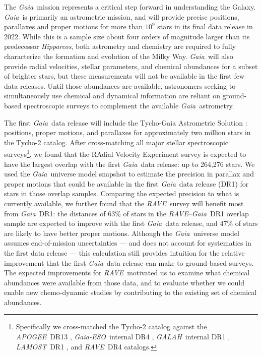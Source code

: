 \documentclass[preprint]{aastex61}
\newcommand{\acronym}[1]{{\small{#1}}}
\newcommand{\project}[1]{\textsl{#1}}
\newcommand{\gaia}{\project{Gaia}}
\newcommand{\rave}{\project{\acronym{RAVE}}}
\newcommand{\galah}{\project{\acronym{GALAH}}}
\newcommand{\ges}{\project{Gaia-ESO}}
\newcommand{\apogee}{\project{\acronym{APOGEE}}}
\newcommand{\lamost}{\project{\acronym{LAMOST}}}
\newcommand{\hipparcos}{\project{Hipparcos}}
\newcommand{\tgas}{\project{\acronym{TGAS}}}
\begin{document}
The \gaia\ mission represents a critical step forward in understanding the Galaxy.
\gaia\ is primarily an astrometric mission, and will provide precise positions,
parallaxes and proper motions for more than $10^9$ stars in its final data
release in 2022.  While this is a sample size about four orders of magnitude 
larger than its predecessor \hipparcos, both astrometry and chemistry are 
required to fully characterize the formation and evolution of the Milky Way. 
\gaia\ will also provide radial velocities, stellar parameters, and chemical 
abundances for a subset of brighter stars, but these measurements will not be 
available in the first few data releases. Until those abundances are available,
astronomers seeking to simultaneously use chemical and dynamical information are
reliant on ground-based spectroscopic surveys to complement the available 
\gaia\ astrometry.


The first \gaia\ data release will include the Tycho-Gaia Astrometric Solution
\citep[hereafter \tgas;][]{Michalik_2015a,Michalik_2015b}: positions, proper 
motions, and parallaxes for approximately two million stars in the Tycho-2 
\citep{Hog_2000} catalog.  After cross-matching all major stellar spectroscopic 
surveys\footnote{Specifically we cross-matched the Tycho-2 catalog against the 
\apogee\ DR13 \citep{Zasowski_2013}, \ges\ internal DR4 
\citep{Gilmore_2012,Randich_2013}, \galah\ internal DR1 \citep{DeSilva_2015}, 
\lamost\ DR1 \citep{Cui_2012}, and \rave\ DR4 \citep{Kordopatis_2013} catalogs.}, 
we found that the RAdial Velocity Experiment \citep[\rave;][]{Steinmetz_2006} 
survey is expected to have the largest overlap with the first \gaia\ 
data release: up to 264,276 stars.  We used the \gaia\ universe model snapshot 
\citep{Robin_2012} to estimate the precision in parallax and proper motions that
could be available in the first \gaia\ data release (DR1) for stars in those 
overlap samples.  Comparing the expected precision to what is currently available, 
we further found that the \rave\ survey will benefit most from \gaia\ DR1: the
distances of 63\% of stars in the \rave--\gaia\ DR1 overlap sample are expected 
to improve with the first \gaia\ data release, and 47\% of stars are likely to
have better proper motions.  Although the \gaia\ universe model assumes 
end-of-mission uncertainties --- and does not account for systematics in the 
first data release --- this calculation still provides intuition for the relative
improvement that the first \gaia\ data release can make to ground-based surveys.  
The expected improvements for \rave\ motivated us to examine what chemical 
abundances were available from those data, and to evaluate whether we could 
enable new chemo-dynamic studies by contributing to the existing set of chemical
abundances.
\end{document}
